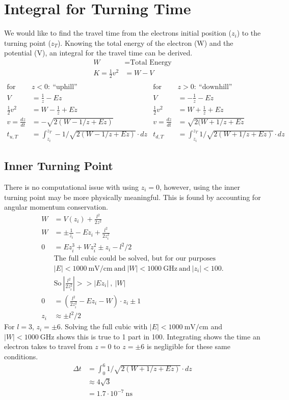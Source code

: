 \documentclass[aps,pra,preprint,groupedaddress]{revtex4-1}
\begin{document}
\section{\label{sec:Turning} Integral for Turning Time}

We would like to find the travel time from the electrons initial position ($z_i$) to the turning point ($z_T$). Knowing the total energy of the electron (W) and the potential (V), an integral for the travel time can be derived.
\begin{align*}
W & = \text{Total Energy} \\
K = \frac{1}{2} v^2 & =  W - V \\
\end{align*}
\begin{align*}
\text{for} ~ & z < 0: ~ \text{``uphill''} & \text{for} ~ & z > 0: ~ \text{``downhill''} \\
V & = \frac{1}{z} - Ez & V & = -\frac{1}{z} - Ez \\
\frac{1}{2} v^2 & = W - \frac{1}{z} + Ez & \frac{1}{2} v^2 & = W + \frac{1}{z} + Ez \\
v = \frac{dz}{dt} & = -\sqrt{2(W - 1/z + Ez)} & v = \frac{dz}{dt} & = \sqrt{2(W + 1/z + Ez} \\
t_{u,T} & = \int_{z_i}^{z_T} -1/\sqrt{2(W - 1/z + Ez)} \cdot dz & t_{d,T} & = \int_{z_i}^{z_T} 1/\sqrt{2(W + 1/z + Ez)} \cdot dz
\end{align*}

\subsection{\label{sec:zi} Inner Turning Point}

There is no computational issue with using $z_i = 0$, however, using the inner turning point may be more physically meaningful. This is found by accounting for angular momentum conservation.
\begin{align*}
W & = V(z_i) + \frac{l^2}{2z^2} \\
W & = \pm \frac{1}{z_i} - Ez_i + \frac{l^2}{2z_i^2} \\
0 & = Ez_i^3 + Wz_i^2 \pm z_i - l^2/2 \\
& \text{The full cubic could be solved, but for our purposes} \\
 & |E| < 1000 ~ \text{mV/cm} ~ \text{and} ~ |W| < 1000 ~ \text{GHz} ~ \text{and} ~ |z_i| < 100. \\
 & \text{So} ~ |\frac{l^2}{2z_i^2}| >> |Ez_i| ~ , ~ |W| \\
0 & = \left(\frac{l^2}{2z_i^2} - Ez_i - W\right) \cdot z_i \pm 1 \\
z_i & \approx \pm l^2/2
\end{align*}
For $l = 3$, $z_i = \pm 6$. Solving the full cubic with $|E| < 1000 ~ \text{mV/cm}$ and $|W| < 1000 ~ \text{GHz}$ shows this is true to 1 part in 100. Integrating shows the time an electron takes to travel from $z = 0$ to $z = \pm 6$ is negligible for these same conditions.
\begin{align*}
\Delta t & = \int_0^6 1/\sqrt{2(W + 1/z + Ez)} \cdot dz \\
 & \approx 4\sqrt{3} \\
 & = 1.7 \cdot 10^{-7} ~ \text{ns} 
\end{align*}
\end{document}
